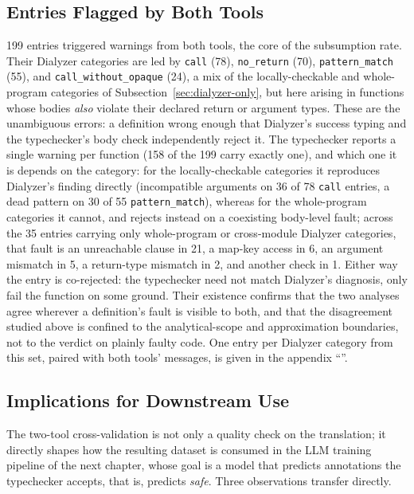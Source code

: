 \subsection{Entries Flagged by Both Tools}
\label{sec:both-warned}

199 entries triggered warnings from both tools, the core of the subsumption rate.
Their Dialyzer categories are led by \texttt{call} (78), \texttt{no\_return} (70), \texttt{pattern\_match} (55), and \texttt{call\_without\_opaque} (24), a mix of the locally-checkable and whole-program categories of Subsection~\ref{sec:dialyzer-only}, but here arising in functions whose bodies \emph{also} violate their declared return or argument types.
These are the unambiguous errors: a definition wrong enough that Dialyzer's success typing and the typechecker's body check independently reject it.
The typechecker reports a single warning per function (158 of the 199 carry exactly one), and which one it is depends on the category: for the locally-checkable categories it reproduces Dialyzer's finding directly (incompatible arguments on 36 of 78 \texttt{call} entries, a dead pattern on 30 of 55 \texttt{pattern\_match}), whereas for the whole-program categories it cannot, and rejects instead on a coexisting body-level fault; across the 35 entries carrying only whole-program or cross-module Dialyzer categories, that fault is an unreachable clause in 21, a map-key access in 6, an argument mismatch in 5, a return-type mismatch in 2, and another check in 1.
Either way the entry is co-rejected: the typechecker need not match Dialyzer's diagnosis, only fail the function on some ground.
Their existence confirms that the two analyses agree wherever a definition's fault is visible to both, and that the disagreement studied above is confined to the analytical-scope and approximation boundaries, not to the verdict on plainly faulty code.
One entry per Dialyzer category from this set, paired with both tools' messages, is given in the appendix ``''.

\subsection{Implications for Downstream Use}
\label{sec:downstream-implications}

The two-tool cross-validation is not only a quality check on the translation; it directly shapes how the resulting dataset is consumed in the LLM training pipeline of the next chapter, whose goal is a model that predicts annotations the typechecker accepts, that is, predicts \emph{safe}.
Three observations transfer directly.

